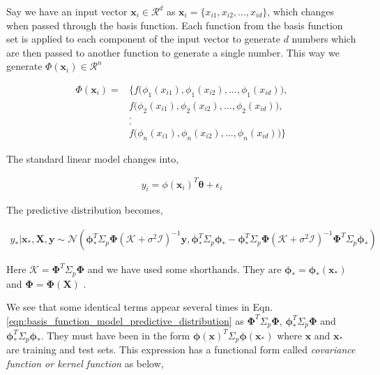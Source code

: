 \documentclass[english]{tktltiki}
\begin{document}
Say we have an input vector $\mathbf{x}_i \in \mathcal{R}^d$ as $\mathbf{x}_i = \{x_{i1}, x_{i2}, ..., x_{id}\}$, which changes when passed through the basis function. Each function from the basis function set is applied to each component of the input vector to generate $d$ numbers which are then passed to another function to generate a single number. This way we generate $\Phi(\mathbf{x}_i) \in \mathcal{R}^n$  

\begin{align}
\label{eqn:basis_function}
	\Phi(\mathbf{x}_i) =  &\Bigg\{f\bigg(\phi_1(x_{i1}), \phi_1(x_{i2}), ..., \phi_1(x_{id})\bigg), \nonumber \\ 
	 &f\bigg(\phi_2(x_{i1}), \phi_2(x_{i2}), ..., \phi_2(x_{id})\bigg), \nonumber \\ 
	 &. \nonumber \\
	 &. \nonumber \\
	 &f\bigg(\phi_n(x_{i1}), \phi_n(x_{i2}), ..., \phi_n(x_{id})\bigg)\Bigg\}
\end{align}

The standard linear model changes into,

\begin{equation}
\label{eqn:basis_function_model}
\begin{split}
	y_i = \phi(\mathbf{x}_i)^T \boldsymbol\theta + \epsilon_i
\end{split}
\end{equation}

The predictive distribution becomes,

\begin{equation}
\label{eqn:basis_function_model_predictive_distribution}
\begin{split}
	y_* | \mathbf{x}_*, \mathbf{X}, \mathbf{y} \sim \mathcal{N}(\boldsymbol\phi_*^T \Sigma_p \boldsymbol\Phi(\mathcal{K} + \sigma^2 \mathcal{I})^{-1} \mathbf{y}, \boldsymbol\phi_*^T \Sigma_p \boldsymbol\phi_* - \boldsymbol\phi_*^T \Sigma_p \boldsymbol\Phi(\mathcal{K} + \sigma^2 \mathcal{I})^{-1} \boldsymbol\Phi^T \Sigma_p \boldsymbol\phi_*)
\end{split}
\end{equation}

Here $\mathcal{K} = \boldsymbol\Phi^T \Sigma_p \boldsymbol\Phi$ and we have used some shorthands. They are $\boldsymbol\phi_* = \boldsymbol\phi_*(\mathbf{x}_*)$ and $\boldsymbol\Phi = \boldsymbol\Phi(\mathbf{X})$ \cite{gaussian_process_for_machine_learning}.

We see that some identical terms appear several times in Eqn. \ref{eqn:basis_function_model_predictive_distribution} as $\boldsymbol\Phi^T \Sigma_p \boldsymbol\Phi$, $\boldsymbol\phi_*^T \Sigma_p \boldsymbol\Phi$ and $\boldsymbol\phi_*^T \Sigma_p \boldsymbol\phi_*$. They must have been in the form $\boldsymbol\phi(\mathbf{x})^T \Sigma_p \boldsymbol\phi(\mathbf{x_*})$ where $\mathbf{x}$ and $\mathbf{x_*}$ are training and test sets. This expression has a functional form called \textit{covariance function or kernel function} as below,
\end{document}
